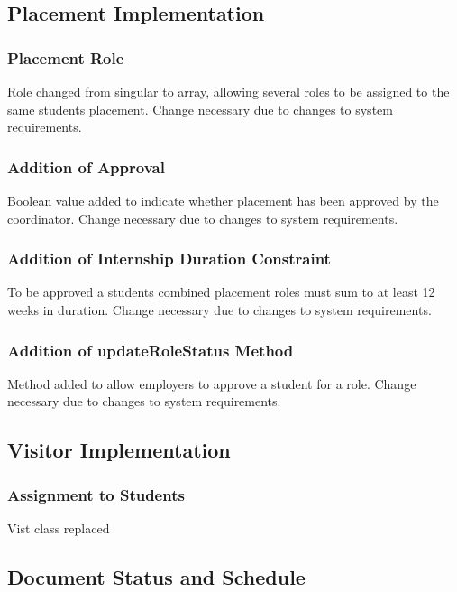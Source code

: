 \documentclass{l3deliverable}
\begin{document}
\subsection{Placement Implementation}

\subsubsection{Placement Role}
Role changed from singular to array, allowing several roles to be assigned to the same students placement. Change necessary due to changes to system requirements.

\subsubsection{Addition of Approval}
Boolean value added to indicate whether placement has been approved by the coordinator. Change necessary due to changes to system requirements.

\subsubsection{Addition of Internship Duration Constraint}
To be approved a students combined placement roles must sum to at least 12 weeks in duration. Change necessary due to changes to system requirements.

\subsubsection{Addition of updateRoleStatus Method}
Method added to allow employers to approve a student for a role. Change necessary due to changes to system requirements.


\subsection{Visitor Implementation}

\subsubsection{Assignment to Students}
Vist class replaced 



\subsection{Document Status and Schedule}
\end{document}
